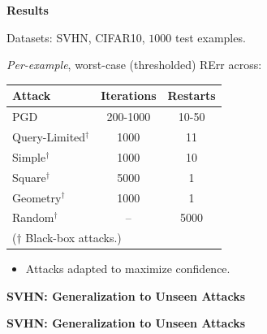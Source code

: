 \documentclass[64pt]{beamer}
\DeclareRobustCommand{\RTE}{%
	\ifmmode
	\text{RErr}
	\else
	RErr\xspace
	\fi
}
\begin{document}
	\begin{frame}[t]{\bfseries Results}
		\Large
		
		Datasets: SVHN, CIFAR10, $1000$ test examples.
		\vskip 0.25cm
		
		\emph{Per-example}, worst-case (thresholded) \RTE across:
		\begin{center}
			\large 
			\begin{tabular}{| l | c | c |}
				\hline
				Attack & Iterations & Restarts\\\hline\hline
				PGD & 200-1000 & 10-50\\
				Query-Limited$^{\boldsymbol{\dagger}}$ & 1000 & 11\\ %
				Simple$^{\boldsymbol{\dagger}}$ & 1000 & 10\\ %
				Square$^{\boldsymbol{\dagger}}$ & 5000 & 1\\ %
				Geometry$^{\boldsymbol{\dagger}}$ & 1000 & 1\\ %
				Random$^{\boldsymbol{\dagger}}$ & -- & 5000\\
				\hline
				\multicolumn{3}{l}{\footnotesize ($\boldsymbol{\dagger}$ Black-box attacks.)}
			\end{tabular}
		\end{center}
		\vspace*{-0.25cm}
		\begin{itemize}
			\item Attacks adapted to maximize confidence.
		\end{itemize}
	\end{frame}

	\begin{frame}{\bfseries SVHN: Generalization to Unseen Attacks}
		\Large 
		\begin{table}
			\centering
			
		\end{table}
	\end{frame}

	\begin{frame}{\bfseries SVHN: Generalization to Unseen Attacks}
		\Large 
		\begin{table}
			\centering
			
		\end{table}
	\end{frame}
\end{document}
